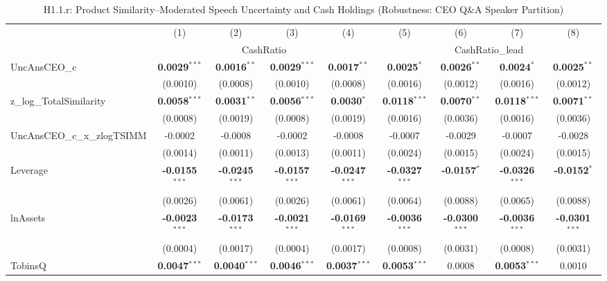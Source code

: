 \begin{landscape}
\begin{table}[H]
\setlength{\tabcolsep}{3pt}
\renewcommand{\arraystretch}{0.85}
\centering
\caption{H1.1.r: Product Similarity--Moderated Speech Uncertainty and Cash Holdings (Robustness: CEO Q\&A Speaker Partition)}
\label{tab:h1_1_robust}
\scriptsize
\begin{tabular}{lcccccccc}
\toprule
 & (1) & (2) & (3) & (4) & (5) & (6) & (7) & (8) \\
 & \multicolumn{4}{c}{CashRatio} & \multicolumn{4}{c}{CashRatio\_lead} \\
\cmidrule(lr){2-5} \cmidrule(lr){6-9}
\midrule
UncAnsCEO\_c & \textbf{0.0029}$^{***}$ & \textbf{0.0016}$^{**}$ & \textbf{0.0029}$^{***}$ & \textbf{0.0017}$^{**}$ & \textbf{0.0025}$^{*}$ & \textbf{0.0026}$^{**}$ & \textbf{0.0024}$^{*}$ & \textbf{0.0025}$^{**}$ \\
 & (0.0010) & (0.0008) & (0.0010) & (0.0008) & (0.0016) & (0.0012) & (0.0016) & (0.0012) \\
z\_log\_TotalSimilarity & \textbf{0.0058}$^{***}$ & \textbf{0.0031}$^{**}$ & \textbf{0.0056}$^{***}$ & \textbf{0.0030}$^{*}$ & \textbf{0.0118}$^{***}$ & \textbf{0.0070}$^{**}$ & \textbf{0.0118}$^{***}$ & \textbf{0.0071}$^{**}$ \\
 & (0.0008) & (0.0019) & (0.0008) & (0.0019) & (0.0016) & (0.0036) & (0.0016) & (0.0036) \\
UncAnsCEO\_c\_x\_zlogTSIMM & -0.0002 & -0.0008 & -0.0002 & -0.0008 & -0.0007 & -0.0029 & -0.0007 & -0.0028 \\
 & (0.0014) & (0.0011) & (0.0013) & (0.0011) & (0.0024) & (0.0015) & (0.0024) & (0.0015) \\
\midrule
Leverage & \textbf{-0.0155}$^{***}$ & \textbf{-0.0245}$^{***}$ & \textbf{-0.0157}$^{***}$ & \textbf{-0.0247}$^{***}$ & \textbf{-0.0327}$^{***}$ & \textbf{-0.0157}$^{*}$ & \textbf{-0.0326}$^{***}$ & \textbf{-0.0152}$^{*}$ \\
 & (0.0026) & (0.0061) & (0.0026) & (0.0061) & (0.0064) & (0.0088) & (0.0065) & (0.0088) \\
lnAssets & \textbf{-0.0023}$^{***}$ & \textbf{-0.0173}$^{***}$ & \textbf{-0.0021}$^{***}$ & \textbf{-0.0169}$^{***}$ & \textbf{-0.0036}$^{***}$ & \textbf{-0.0300}$^{***}$ & \textbf{-0.0036}$^{***}$ & \textbf{-0.0301}$^{***}$ \\
 & (0.0004) & (0.0017) & (0.0004) & (0.0017) & (0.0008) & (0.0031) & (0.0008) & (0.0031) \\
TobinsQ & \textbf{0.0047}$^{***}$ & \textbf{0.0040}$^{***}$ & \textbf{0.0046}$^{***}$ & \textbf{0.0037}$^{***}$ & \textbf{0.0053}$^{***}$ & 0.0008 & \textbf{0.0053}$^{***}$ & 0.0010 \\

\end{tabular}
\end{table}
\end{landscape}
